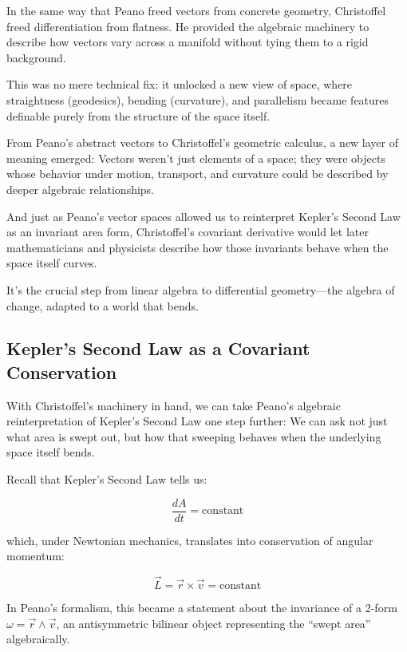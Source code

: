 \bigskip

In the same way that Peano freed vectors from concrete geometry, Christoffel freed differentiation from flatness.  
He provided the algebraic machinery to describe how vectors vary across a manifold without tying them to a rigid background.

This was no mere technical fix: it unlocked a new view of space, where straightness (geodesics), bending (curvature), and parallelism became features definable purely from the structure of the space itself.

\bigskip

From Peano’s abstract vectors to Christoffel’s geometric calculus, a new layer of meaning emerged:  
Vectors weren’t just elements of a space; they were objects whose behavior under motion, transport, and curvature could be described by deeper algebraic relationships.

And just as Peano’s vector spaces allowed us to reinterpret Kepler’s Second Law as an invariant area form,  
Christoffel’s covariant derivative would let later mathematicians and physicists describe how those invariants behave when the space itself curves.

It’s the crucial step from linear algebra to differential geometry—the algebra of change, adapted to a world that bends.

\subsection{Kepler’s Second Law as a Covariant Conservation}

With Christoffel’s machinery in hand, we can take Peano’s algebraic reinterpretation of Kepler’s Second Law one step further:  
We can ask not just what area is swept out, but how that sweeping behaves when the underlying space itself bends.

\bigskip

Recall that Kepler’s Second Law tells us:

\[
\frac{dA}{dt} = \text{constant}
\]

which, under Newtonian mechanics, translates into conservation of angular momentum:

\[
\vec{L} = \vec{r} \times \vec{v} = \text{constant}
\]

In Peano’s formalism, this became a statement about the invariance of a 2-form \( \omega = \vec{r} \wedge \vec{v} \), an antisymmetric bilinear object representing the “swept area” algebraically.

